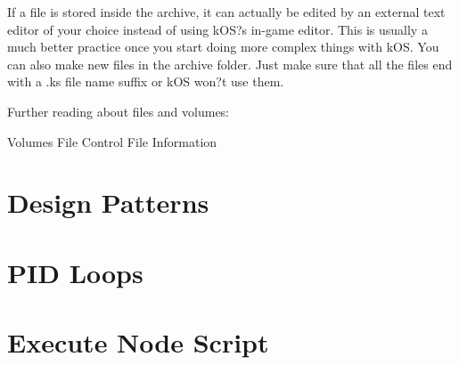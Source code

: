 If a file is stored inside the archive, it can actually be edited by an external text editor of your choice instead of using kOS?s in-game editor. This is usually a much better practice once you start doing more complex things with kOS. You can also make new files in the archive folder. Just make sure that all the files end with a .ks file name suffix or kOS won?t use them.	

Further reading about files and volumes:

Volumes
File Control
File Information		
	\section{Design Patterns}
	\section{PID Loops}
	\section{Execute Node Script}
